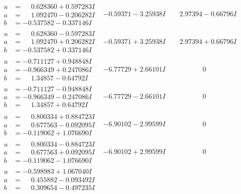\documentclass[1p]{elsarticle_modified}
\theoremstyle{definition}
\begin{document}
$$\begin{array}{c|c|c}
\begin{aligned}
u &= \phantom{-}0.628360 + 0.597283 I \\
a &= \phantom{-}1.092470 - 0.206282 I \\
b &= -0.537582 - 0.337146 I\end{aligned}
 & -0.59371 - 3.25938 I & \phantom{-}2.97394 - 0.66796 I \\ \hline\begin{aligned}
u &= \phantom{-}0.628360 - 0.597283 I \\
a &= \phantom{-}1.092470 + 0.206282 I \\
b &= -0.537582 + 0.337146 I\end{aligned}
 & -0.59371 + 3.25938 I & \phantom{-}2.97394 + 0.66796 I \\ \hline\begin{aligned}
u &= -0.711127 + 0.948848 I \\
a &= -0.966349 + 0.247086 I \\
b &= \phantom{-}1.34857 - 0.64792 I\end{aligned}
 & -6.77729 + 2.66101 I & \phantom{-0.000000 } 0 \\ \hline\begin{aligned}
u &= -0.711127 - 0.948848 I \\
a &= -0.966349 - 0.247086 I \\
b &= \phantom{-}1.34857 + 0.64792 I\end{aligned}
 & -6.77729 - 2.66101 I & \phantom{-0.000000 } 0 \\ \hline\begin{aligned}
u &= \phantom{-}0.800334 + 0.884723 I \\
a &= \phantom{-}0.677563 - 0.092095 I \\
b &= -0.119062 + 1.076690 I\end{aligned}
 & -6.90102 - 2.99599 I & \phantom{-0.000000 } 0 \\ \hline\begin{aligned}
u &= \phantom{-}0.800334 - 0.884723 I \\
a &= \phantom{-}0.677563 + 0.092095 I \\
b &= -0.119062 - 1.076690 I\end{aligned}
 & -6.90102 + 2.99599 I & \phantom{-0.000000 } 0 \\ \hline\begin{aligned}
u &= -0.598983 + 1.067040 I \\
a &= \phantom{-}0.455882 - 0.093492 I \\
b &= \phantom{-}0.309654 - 0.497235 I\end{aligned}

\end{array}$$
\end{document}
